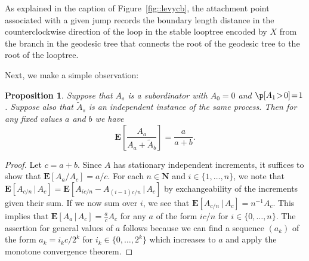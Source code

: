 \documentclass[JEP,XML,SOM,Unicode]{cedram}
\theoremstyle{plain}
\numberwithin{theorem}{section}
\newtheorem{proposition}[theorem]{Proposition}
\theoremstyle{definition}
\newcommand \E {{\mathbf E}}
\newcommand{\N}{\mathbf{N}}
\let\wt\widetilde
\newcommand{\giv}{\,|\,}
\begin{document}
As explained in the caption of Figure~\ref{fig::levycb}, the attachment point associated with a given jump records the boundary length distance in the counterclockwise direction of the loop in the stable looptree encoded by $X$ from the branch in the geodesic tree that connects the root of the geodesic tree to the root of the looptree.

Next, we make a simple observation:

\begin{proposition}
\label{prop::easyexpectationratiofact}
Suppose that $A_s$ is a subordinator with $A_0\!=\!0$ and $\p[A_1\!>\!0]\!=\!1$. Suppose also that $\wt A_s$ is an independent instance of the same process. Then for any fixed values $a$ and $b$ we have
\begin{equation}
\label{eqn::a_wt_b_ratio}
\E \left[\frac{A_a}{A_a + \wt A_b} \right] = \frac{a}{a+b}.
\end{equation}
\end{proposition}
\begin{proof}
Let $c = a+b$. Since $A$ has stationary independent increments, it suffices to show that $\E[ A_a/A_c] = a/c$. For each $n \in \N$ and $i \in \{1,\ldots,n\}$, we note that $\E[ A_{c/n} \giv A_c] = \E[ A_{ic/n} - A_{(i-1)c/n} \giv A_c]$ by exchangeability of the increments given their sum. If we now sum over $i$, we see that $\E[ A_{c/n} \giv A_c] = n^{-1} A_c$. This implies that $\E[ A_a \giv A_c] = \tfrac{a}{c} A_c$ for any $a$ of the form $i c/n$ for $i \in \{0,\ldots,n\}$. The assertion for general values of $a$ follows because we can find a sequence $(a_k)$ of the form $a_k = i_k c / 2^k$ for $i_k \in \{0,\ldots,2^k\}$ which increases to $a$ and apply the monotone convergence theorem.
\end{proof}
\end{document}
